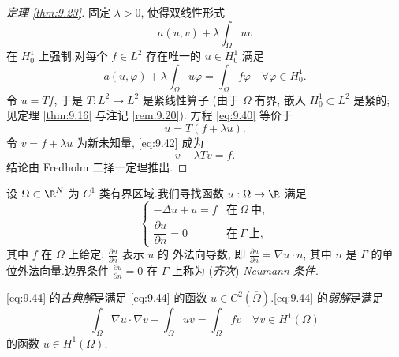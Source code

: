 \begin{proof}[定理 \ref{thm:9.23}]
固定 $\lambda>0$, 使得双线性形式
\begin{equation*}
a(u,v)+\lambda\int_\Omega uv
\end{equation*}
在 $H_0^1$ 上强制.对每个 $f\in L^2$ 存在唯一的 $u\in H_0^1$ 满足
\begin{equation*}
a(u,\varphi)+\lambda\int_\Omega u\varphi=\int_\Omega f\varphi
\quad\forall\varphi\in H_0^1.
\end{equation*}
令 $u=Tf$, 于是 $T:L^2\to L^2$ 是紧线性算子 (由于 $\Omega$ 有界, 嵌入
$H_0^1\subset L^2$ 是紧的; 见定理  \ref{thm:9.16} 与注记 \ref{rem:9.20}).
方程 \eqref{eq:9.40} 等价于
\begin{equation}
u=T(f+\lambda u).
\label{eq:9.42}
\end{equation}
令 $v=f+\lambda u$ 为新未知量, \eqref{eq:9.42} 成为
\begin{equation}
v-\lambda Tv=f.
\label{eq:9.43}
\end{equation}
结论由 Fredholm 二择一定理推出.
\end{proof}

\begin{example}[齐次 Neumann 问题]
\label{ex:9.4}
设 $\Omega\subset\R^N$ 为 $C^1$ 类有界区域.我们寻找函数
$u:\Omega\to\R$ 满足
\begin{equation}
\begin{cases}
-\Delta u+u=f & \text{在}\ \Omega\ \text{中},\\[1mm]
\dfrac{\partial u}{\partial n}=0 & \text{在}\ \Gamma\ \text{上},
\end{cases}
\label{eq:9.44}
\end{equation}
其中 $f$ 在 $\Omega$ 上给定; $\frac{\partial u}{\partial n}$ 表示 $u$ 的
外法向导数, 即 $\frac{\partial u}{\partial n}=\nabla u\cdot n$, 其中
$n$ 是 $\Gamma$ 的单位外法向量.边界条件 $\frac{\partial u}{\partial n}=0$
在 $\Gamma$ 上称为 (\emph{齐次}) \emph{Neumann 条件}.
\end{example}

\begin{definition}
\eqref{eq:9.44} 的\emph{古典解}是满足 \eqref{eq:9.44} 的函数
$u\in C^2(\overline\Omega)$.\eqref{eq:9.44} 的\emph{弱解}是满足
\begin{equation}
\int_\Omega\nabla u\cdot\nabla v+\int_\Omega uv=\int_\Omega fv
\quad\forall v\in H^1(\Omega)
\label{eq:9.45}
\end{equation}
的函数 $u\in H^1(\Omega)$.
\end{definition}

